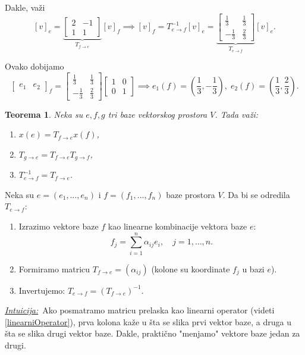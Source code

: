 \documentclass[a4paper,12pt,twoside]{report}
\newtheorem{theorem}{Teorema}[section]
\numberwithin{algorithm}{section}
\newcommand{\intuicija}{\noindent\underline{\textit{Intuicija:}}\ }
\begin{document}
\begin{itemize}
    Dakle, važi
    \[ [v]_e = \underbrace{\begin{bmatrix}
        2 & -1 \\
        1 & 1
    \end{bmatrix}}_{T_{f\to e}} [v]_f \implies [v]_f = T_{e \to f}^{-1}[v]_e = \underbrace{\begin{bmatrix}
        \frac{1}{3} & \frac{1}{3} \\[4pt]
        -\frac{1}{3} & \frac{2}{3}
    \end{bmatrix}}_{T_{e \to f}}[v]_e.\]

    Ovako dobijamo
    \[ \begin{bmatrix}
        e_1 & e_2
    \end{bmatrix}_f = \begin{bmatrix}
        \frac{1}{3} & \frac{1}{3} \\[4pt]
        -\frac{1}{3} & \frac{2}{3}
    \end{bmatrix} \begin{bmatrix}
        1 & 0 \\
        0 & 1
    \end{bmatrix}\implies e_1(f) = \left(\frac{1}{3}, -\frac{1}{3}\right), \; e_2(f) = \left(\frac{1}{3}, \frac{2}{3}\right).\]
\end{itemize}

\begin{theorem}
    Neka su $e, f, g$ tri baze vektorskog prostora $V$. Tada važi:
    \begin{enumerate}
        \item $x(e) = T_{f \to e}x(f)$,
        \item $T_{g \to e} = T_{f \to e}T_{g \to f}$,
        \item $T_{e \to f}^{-1} = T_{f \to e}$.
    \end{enumerate}
\end{theorem}

\begin{algorithm}
    \caption{Opšti postupak za određivanje matrice prelaska}

    Neka su $e = (e_1, \dots, e_n)$ i $f = (f_1, \dots, f_n)$ baze prostora $V$. 
    Da bi se odredila $T_{e \to f}$:
    \begin{enumerate}
        \item Izrazimo vektore baze $f$ kao linearne kombinacije vektora baze $e$:
        \[ f_j = \sum_{i=1}^n \alpha_{ij} e_i, \quad j = 1, \dots, n. \]
        \item Formiramo matricu $T_{f \to e} = (\alpha_{ij})$ (kolone su koordinate $f_j$ u bazi $e$).
        \item Invertujemo: $T_{e \to f} = (T_{f \to e})^{-1}$.
    \end{enumerate}
\end{algorithm}
\intuicija Ako posmatramo matricu prelaska kao linearni operator (videti \ref{linearniOperator}), prva kolona kaže u šta se slika prvi vektor baze, a druga 
u šta se slika drugi vektor baze. Dakle, praktično "menjamo" vektore baze jedan za drugi.
\end{document}
